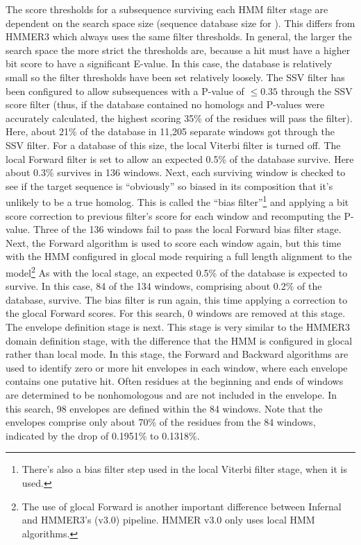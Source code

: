 The score thresholds for a subsequence surviving each HMM filter stage
are dependent on the search space size (sequence database size for
). This differs from HMMER3 which always uses the same
filter thresholds. In general, the larger the search
space the more strict the thresholds are, because a hit must have a
higher bit score to have a significant E-value.  In this case, the
database is relatively small so the filter thresholds have been set
relatively loosely. The SSV filter has been configured to allow
subsequences with a P-value of $\leq 0.35$ through
the SSV score filter (thus, if the database contained no homologs and
P-values were accurately calculated, the highest scoring 35\% of the
residues will pass the filter). Here, about 21\% of the database in
11,205 separate windows got through the SSV filter. For a database of
this size, the local Viterbi filter is turned off.  The local Forward filter
is set to allow an expected 0.5\% of the database survive. Here about
0.3\% survives in 136 windows. Next, each surviving window is checked
to see if the target sequence is ``obviously'' so biased in its
composition that it's unlikely to be a true homolog. This is called
the ``bias filter''\footnote{There's also a bias filter step used in
  the local Viterbi filter stage, when it is used.} and applying a bit
score correction to previous filter's score for each window and
recomputing the P-value. Three of the 136 windows fail to pass
the local Forward bias filter stage. Next, the Forward algorithm is
used to score each window again, but this time with the HMM configured
in glocal mode requiring a full length alignment to the
model\footnote{The use of glocal Forward is another important
  difference between Infernal and HMMER3's (v3.0) pipeline. HMMER v3.0
  only uses local HMM algorithms.}  As with the local stage, an
expected 0.5\% of the database is expected to survive. In this case,
84 of the 134 windows, comprising about 0.2\% of the database,
survive. The bias filter is run again, this time applying a correction
to the glocal Forward scores. For this search, 0 windows are removed at
this stage. The envelope definition stage is next. This stage is very
similar to the HMMER3 domain definition stage, with the difference
that the HMM is configured in glocal rather than local mode. In this
stage, the Forward and Backward algorithms are used to identify zero
or more hit envelopes in each window, where each envelope contains one
putative hit.  Often residues at the beginning and ends of windows are
determined to be nonhomologous and are not included in the
envelope. In this search,  98 envelopes are defined within the 84
windows. Note that the envelopes comprise only about 70\% of the
residues from the 84 windows, indicated by the drop of 0.1951\% to
0.1318\%.

